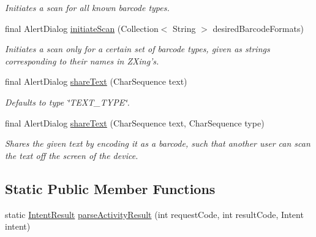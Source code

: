 \begin{DoxyCompactItemize}
\begin{DoxyCompactList}\small\item\em Initiates a scan for all known barcode types. \end{DoxyCompactList}\item 
final Alert\-Dialog \hyperlink{classcom_1_1lakehead_1_1textbookmarket_1_1_intent_integrator_ad98353127075e67a23ba28469ea2e783}{initiate\-Scan} (Collection$<$ String $>$ desired\-Barcode\-Formats)
\begin{DoxyCompactList}\small\item\em Initiates a scan only for a certain set of barcode types, given as strings corresponding to their names in Z\-Xing's. \end{DoxyCompactList}\item 
final Alert\-Dialog \hyperlink{classcom_1_1lakehead_1_1textbookmarket_1_1_intent_integrator_a5cd66f2b7317e3fea3a4ec10b20d554a}{share\-Text} (Char\-Sequence text)
\begin{DoxyCompactList}\small\item\em Defaults to type \char`\"{}\-T\-E\-X\-T\-\_\-\-T\-Y\-P\-E\char`\"{}. \end{DoxyCompactList}\item 
final Alert\-Dialog \hyperlink{classcom_1_1lakehead_1_1textbookmarket_1_1_intent_integrator_afd60e9ddeabf93d8a3a2c6635871bf31}{share\-Text} (Char\-Sequence text, Char\-Sequence type)
\begin{DoxyCompactList}\small\item\em Shares the given text by encoding it as a barcode, such that another user can scan the text off the screen of the device. \end{DoxyCompactList}\end{DoxyCompactItemize}
\subsection*{Static Public Member Functions}
\begin{DoxyCompactItemize}
\item 
static \hyperlink{classcom_1_1lakehead_1_1textbookmarket_1_1_intent_result}{Intent\-Result} \hyperlink{classcom_1_1lakehead_1_1textbookmarket_1_1_intent_integrator_a50a341fab25e1d92cdee40192daad65e}{parse\-Activity\-Result} (int request\-Code, int result\-Code, Intent intent)
\end{DoxyCompactItemize}
